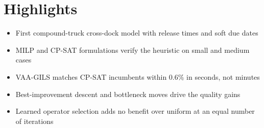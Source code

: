 \documentclass{article}
\begin{document}
\section*{Highlights}

\begin{itemize}
\item First compound-truck cross-dock model with release times and soft due
dates
\item MILP and CP-SAT formulations verify the heuristic on small and medium
cases
\item VAA-GILS matches CP-SAT incumbents within 0.6\% in seconds, not minutes
\item Best-improvement descent and bottleneck moves drive the quality gains
\item Learned operator selection adds no benefit over uniform at an equal number of iterations
\end{itemize}
\end{document}
